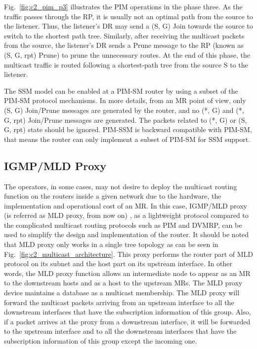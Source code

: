 Fig.~\ref{fig:c2_pim_p3} illustrates the PIM operations in the phase three. As the traffic passes through the RP, it is usually not an optimal path from the source to the listener. Thus, the listener's DR may send a (S, G) Join towards the source to switch to the shortest path tree. Similarly, after receiving the multicast packets from the source, the listener's DR sends a Prune message to the RP (known as  (S, G, rpt) Prune) to prune the unnecessary routes. At the end of this phase, the multicast traffic is routed following a shortest-path tree from the source S to the listener. 

The SSM model can be enabled at a PIM-SM router by using a subset of the PIM-SM protocol mechanisms. In more details, from an MR point of view, only (S, G) Join/Prune messages are generated by the router, and no (*, G) and (*, G, rpt) Join/Prune messages are generated. The packets related to (*, G) or (S, G, rpt) state should be ignored. PIM-SSM is backward compatible with PIM-SM, that means the router can only implement a subset of PIM-SM for SSM support. 
 
\subsection{IGMP/MLD Proxy}
The operators, in some cases, may not desire to deploy the multicast routing function on the routers inside a given network due to the hardware, the implementation and operational cost of an MR. In this case, IGMP/MLD proxy (is referred as MLD proxy, from now on) \cite{MLD_proxy}, as a lightweight protocol compared to the complicated multicast routing protocols such as PIM and DVMRP, can be used to simplify the design and implementation of the router. It should be noted that MLD proxy only works in a single tree topology as can be seen in Fig.~\ref{fig:c2_multicast_architecture}. This proxy performs the router part of MLD protocol on its subnet and the host part on its upstream interface. In other words, the MLD proxy function allows an intermediate node to appear as an MR to the downstream hosts and as a host to the upstream MRs. The MLD proxy device maintains a database as a multicast membership. The MLD proxy will forward the multicast packets arriving from an upstream interface to all the downstream interfaces that have the subscription information of this group. Also, if a packet arrives at the proxy from a downstream interface, it will be forwarded to the upstream interface and to all the downstream interfaces that have the subscription information of this group except the incoming one. 

